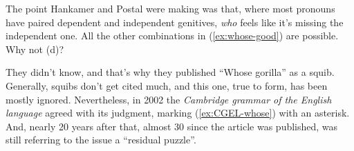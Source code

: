 The point Hankamer and Postal were making was that, where most pronouns have paired dependent and independent genitives, \textit{who} feels like it's missing the independent one. All the other combinations in (\ref{ex:whose-good}) are possible. Why not (d)?

\ea \label{ex:whose-good}
 \z
\z

They didn't know, and that's why they published ``Whose gorilla'' as a squib. Generally, squibs don't get cited much, and this one, true to form, has been mostly ignored. Nevertheless, in 2002 the \textit{Cambridge grammar of the English language} agreed with its judgment, marking (\ref{ex:CGEL-whose}) with an asterisk. And, nearly 20 years after that, almost 30 since the article was published, \citet{Cinque2020a} was still referring to the issue a ``residual puzzle''. 

\label{ex:CGEL-whose}
\z

\bigskip

